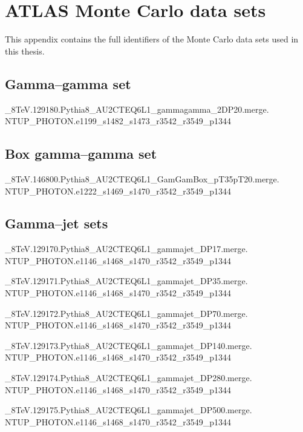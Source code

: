 \appendix

\chapter{ATLAS Monte Carlo data sets}
This appendix contains the full identifiers of the \atlas{} Monte Carlo data sets used in this thesis.

\section{Gamma--gamma set}\label{ax.gg}
\_8TeV.129180.Pythia8\_AU2CTEQ6L1\_gammagamma\_2DP20.merge. \\NTUP\_PHOTON.e1199\_s1482\_s1473\_r3542\_r3549\_p1344

\section{Box gamma--gamma set}\label{ax.ggb}
\_8TeV.146800.Pythia8\_AU2CTEQ6L1\_GamGamBox\_pT35pT20.merge. \\NTUP\_PHOTON.e1222\_s1469\_s1470\_r3542\_r3549\_p1344

\section{Gamma--jet sets}\label{ax.gj}
\_8TeV.129170.Pythia8\_AU2CTEQ6L1\_gammajet\_DP17.merge. \\NTUP\_PHOTON.e1146\_s1468\_s1470\_r3542\_r3549\_p1344

\_8TeV.129171.Pythia8\_AU2CTEQ6L1\_gammajet\_DP35.merge. \\NTUP\_PHOTON.e1146\_s1468\_s1470\_r3542\_r3549\_p1344

\_8TeV.129172.Pythia8\_AU2CTEQ6L1\_gammajet\_DP70.merge. \\NTUP\_PHOTON.e1146\_s1468\_s1470\_r3542\_r3549\_p1344

\_8TeV.129173.Pythia8\_AU2CTEQ6L1\_gammajet\_DP140.merge. \\NTUP\_PHOTON.e1146\_s1468\_s1470\_r3542\_r3549\_p1344

\_8TeV.129174.Pythia8\_AU2CTEQ6L1\_gammajet\_DP280.merge. \\NTUP\_PHOTON.e1146\_s1468\_s1470\_r3542\_r3549\_p1344

\_8TeV.129175.Pythia8\_AU2CTEQ6L1\_gammajet\_DP500.merge. \\NTUP\_PHOTON.e1146\_s1468\_s1470\_r3542\_r3549\_p1344

